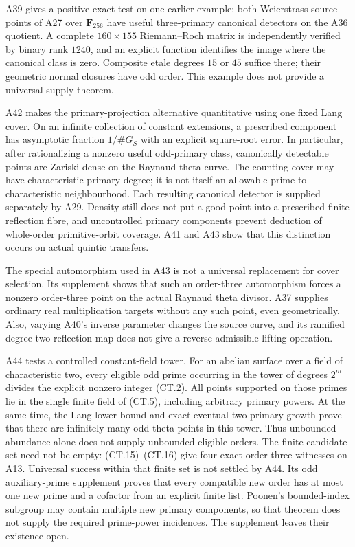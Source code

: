 A39 gives a positive exact test on one earlier example: both
Weierstrass source points of A27 over $\mathbf F_{256}$ have useful
three-primary canonical detectors on the A36 quotient. A complete
$160\times155$ Riemann--Roch matrix is independently verified by
binary rank $1240$, and an explicit function identifies the image
where the canonical class is zero. Composite etale degrees $15$ or
$45$ suffice there; their geometric normal closures have odd order.
This example does not provide a universal supply theorem.


A42 makes the primary-projection alternative quantitative using one
fixed Lang cover. On an infinite collection of constant extensions, a
prescribed component has asymptotic fraction $1/\#G_S$ with an explicit
square-root error. In particular, after rationalizing a nonzero useful
odd-primary class, canonically detectable points are Zariski dense on
the Raynaud theta curve. The counting cover may have characteristic-primary
degree; it is not itself an allowable prime-to-characteristic
neighbourhood. Each resulting canonical detector is supplied separately
by A29. Density still does not put a good point into a prescribed finite
reflection fibre, and uncontrolled primary components prevent deduction
of whole-order primitive-orbit coverage. A41 and A43 show that this
distinction occurs on actual quintic transfers.


The special automorphism used in A43 is not a universal replacement
for cover selection. Its supplement shows that such an order-three
automorphism forces a nonzero order-three point on the actual Raynaud
theta divisor. A37 supplies ordinary real multiplication targets
without any such point, even geometrically. Also, varying A40's inverse
parameter changes the source curve, and its ramified degree-two
reflection map does not give a reverse admissible lifting operation.

A44 tests a controlled constant-field tower. For an abelian surface over
a field of characteristic two, every eligible odd prime occurring in
the tower of degrees $2^m$ divides the explicit nonzero integer (CT.2).
All points supported on those primes lie in the single finite field
of (CT.5), including arbitrary primary powers. At the same time,
the Lang lower bound and exact eventual two-primary growth prove that
there are infinitely many odd theta points in this tower. Thus
unbounded abundance alone does not supply unbounded eligible orders.
The finite candidate set need not be empty: (CT.15)--(CT.16) give
four exact order-three witnesses on A13. Universal success within that finite set is not settled by A44. Its
odd auxiliary-prime supplement proves that every compatible new order
has at most one new prime and a cofactor from an explicit finite list.
Poonen's bounded-index subgroup may contain multiple new primary
components, so that theorem does not supply the required prime-power
incidences. The supplement leaves their existence open.

